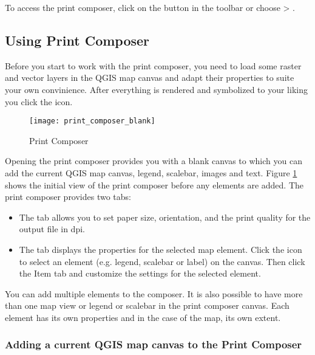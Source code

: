 To access the print composer, click on the 
button in the toolbar or choose  > .

\subsection{Using Print Composer}\label{label_useprintcomposer} 

Before you start to work with the print composer, you need to load some 
raster and vector layers in the QGIS map canvas and adapt their properties 
to suite your own convinience. After everything is rendered and symbolized to your liking you click the  icon.

\begin{figure}[ht]
   \begin{center}
   \caption{Print Composer}\label{fig:print_composer_blank}\smallskip
   \texttt{[image: print\_composer\_blank]}
\end{center}  
\end{figure}

Opening the print composer provides you with a blank canvas to which you can 
add the current QGIS map canvas, legend, scalebar, images and text. Figure
\ref{fig:print_composer_blank} shows the initial view of the print composer before any elements are added. The print composer provides two tabs:

\begin{itemize}
\item The  tab allows you to set paper size, orientation, and the print quality for the output file in dpi.
\item The  tab displays the properties for the selected map element. Click the  
icon to select an element (e.g. legend, scalebar or label) on the canvas. 
Then click the Item tab and customize the settings for the selected 
element.
\end{itemize}

You can add multiple elements to the composer. It is also possible to have 
more than one map view or legend or scalebar in the print composer canvas. 
Each element has its own properties and in the case of the map, its own 
extent.

\subsubsection{Adding a current QGIS map canvas to the Print Composer}

